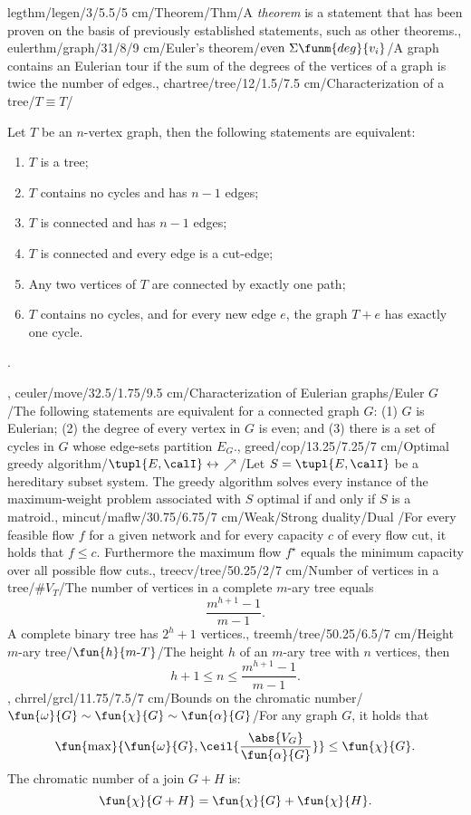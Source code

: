legthm/legen/3/5.5/5 cm/Theorem/Thm/{A \emph{theorem} is a statement that has been proven on the basis of previously established statements, such as other theorems.},
eulerthm/graph/31/8/9 cm/{Euler's theorem}/$\mbox{even}\ \Sigma{\funm{deg}{v_i}}$/{A graph contains an Eulerian tour if the sum of the degrees of the vertices of a graph is twice the number of edges.},
chartree/tree/12/1.5/7.5 cm/{Characterization of a tree}/{$T\equiv T$}/{Let $T$ be an $n$-vertex graph, then the following statements are equivalent:\begin{enumerate}\item $T$ is a tree; \item $T$ contains no cycles and has $n-1$ edges; \item $T$ is connected and has $n-1$ edges; \item $T$ is connected and every edge is a cut-edge; \item Any two vertices of $T$ are connected by exactly one path; \item $T$ contains no cycles, and for every new edge $e$, the graph $T+e$ has exactly one cycle.\end{enumerate}.},
ceuler/move/32.5/1.75/9.5 cm/{Characterization of Eulerian graphs}/{Euler $G$}/{The following statements are equivalent for a connected graph $G$: (1) $G$ is Eulerian; (2) the degree of every vertex in $G$ is even; and (3) there is a set of cycles in $G$ whose edge-sets partition $E_G$.},
greed/cop/13.25/7.25/7 cm/{Optimal greedy algorithm}/{$\tupl{E,\calI}\leftrightarrow$\textdollaroldstyle$\nearrow$}/{Let $S=\tupl{E,\calI}$ be a hereditary subset system. The greedy algorithm solves every instance of the maximum-weight problem associated with $S$ optimal if and only if $S$ is a matroid.},
mincut/maflw/30.75/6.75/7 cm/{Weak/Strong duality}/{Dual \watertap}/{For every feasible flow $f$ for a given network and for every capacity $c$ of every flow cut, it holds that $f\leq c$. Furthermore the maximum flow $f^{\star}$ equals the minimum capacity over all possible flow cuts.},
treecv/tree/50.25/2/7 cm/{Number of vertices in a tree}/{$\#V_T$}/{The number of vertices in a complete $m$-ary tree equals\[\dfrac{m^{h+1}-1}{m-1}.\] A complete binary tree has $2^h+1$ vertices.},
treemh/tree/50.25/6.5/7 cm/{Height $m$-ary tree}/{$\fun{h}{m\mbox{-}T}$}/{The height $h$ of an $m$-ary tree with $n$ vertices, then \[h+1\leq n\leq\dfrac{m^{h+1}-1}{m-1}.\]},
chrrel/grcl/11.75/7.5/7 cm/{Bounds on the chromatic number}/{$\fun{\omega}{G}\sim\fun{\chi}{G}\sim\fun{\alpha}{G}$}/{For any graph $G$, it holds that \[\fun{\max}{\fun{\omega}{G},\ceil{\dfrac{\abs{V_G}}{\fun{\alpha}{G}}}}\leq\fun{\chi}{G}.\] The chromatic number of a join $G+H$ is: \[\fun{\chi}{G+H}=\fun{\chi}{G}+\fun{\chi}{H}.\]}